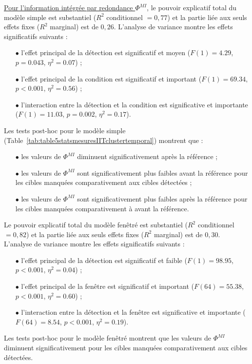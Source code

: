 \underline{Pour l'information intégrée par redondance $\Phi^{MI}$}, le pouvoir explicatif total du modèle simple est substantiel ($R^2$ conditionnel $=0,77$) et la partie liée aux seuls effets fixes ($R^2$ marginal) est de $0,26$. 
L'analyse de variance montre les effets significatifs suivants : 
\begin{itemize}
\item[$\bullet$] l'effet principal de la détection est significatif et moyen ($F(1)=4.29$, $p=0.043$, $\eta^2=0.07$) ; 
\item[$\bullet$] l'effet principal de la condition est significatif et important ($F(1)=69.34$, $p<0.001$, $\eta^2=0.56$) ;
\item[$\bullet$] l'interaction entre la détection et la condition est significative et importante ($F(1)=11.03$, $p=0.002$, $\eta^2=0.17$).
\end{itemize}
Les tests post-hoc pour le modèle simple (Table~\ref{tab:table5statsmesuresIITclustertemporal}) montrent que : 
\begin{itemize}
\item[$\bullet$] les valeurs de $\Phi^{MI}$ diminuent significativement après la référence ; 
\item[$\bullet$] les valeurs de $\Phi^{MI}$ sont significativement plus faibles avant la référence pour les cibles manquées comparativement aux cibles détectées ;
\item[$\bullet$] les valeurs de $\Phi^{MI}$ sont significativement plus faibles après la référence pour les cibles manquées comparativement à avant la référence. 
\end{itemize}
Le pouvoir explicatif total du modèle fenêtré est substantiel ($R^2$ conditionnel $=0,82$) et la partie liée aux seuls effets fixes ($R^2$ marginal) est de $0,30$. 
L'analyse de variance montre les effets significatifs suivants : 
\begin{itemize}
\item[$\bullet$] l'effet principal de la détection est significatif et faible ($F(1)=98.95$, $p<0.001$, $\eta^2=0.04$) ; 
\item[$\bullet$] l'effet principal de la fenêtre est significatif et important ($F(64)=55.38$, $p<0.001$, $\eta^2=0.60$) ;
\item[$\bullet$] l'interaction entre la détection et la fenêtre est significative et importante ($F(64)=8.54$, $p<0.001$, $\eta^2=0.19$). 
\end{itemize}
Les tests post-hoc pour le modèle fenêtré montrent que les valeurs de $\Phi^{MI}$ diminuent significativement pour les cibles manquées comparativement aux cibles détectées. \\

